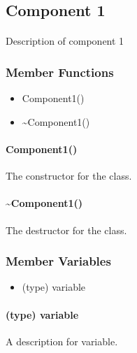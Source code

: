 \hypertarget{website_component1}
{
    \label{website_component1}
}

\subsection{Component 1}
    \paragraph{}
        Description of component 1

    \subsubsection{Member Functions}

        \begin{itemize}
            \item Component1()
            \item \textasciitilde Component1()
        \end{itemize}

        \paragraph{Component1()}
            \hfill \break
            The constructor for the class.
        
        \paragraph{\textasciitilde Component1()}
            \hfill \break
            The destructor for the class.

    \subsubsection{Member Variables}
        
        \begin{itemize}
            \item (type) variable
        \end{itemize}

        \paragraph{(type) variable}
            A description for variable.
        